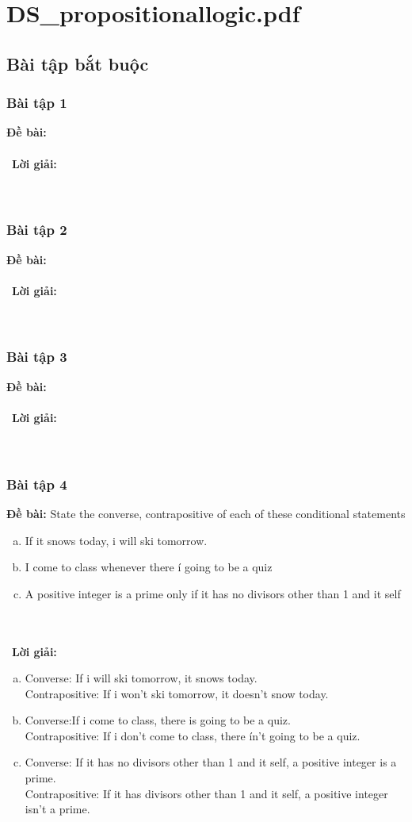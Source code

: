 \documentclass[a4paper]{article}
\begin{document}
\tableofcontents
\newpage
\section{DS\_propositionallogic.pdf}
\subsection{Bài tập bắt buộc}
\subsubsection{Bài tập 1}
\textbf{Đề bài:} 
\\\ \\\
\textbf{Lời giải:} \\\ \\\
\clearpage
\subsubsection{Bài tập 2}
\textbf{Đề bài:} 
\\\ \\\
\textbf{Lời giải:} \\\ \\\
\clearpage
\subsubsection{Bài tập 3}
\textbf{Đề bài:} 
\\\ \\\
\textbf{Lời giải:} \\\ \\\
\clearpage
\subsubsection{Bài tập 4} 
\textbf{Đề bài:} State the converse, contrapositive of each of these conditional statements
\begin{enumerate}[a)]
\item If it snows today, i will ski tomorrow.
\item I come to class whenever  there í going to be a quiz
\item A positive integer is a prime only if it has no divisors other than 1 and it self
\end{enumerate}
\\\ \\\
\textbf{Lời giải:} 
\begin{enumerate}[a)]
\item Converse: If i will ski tomorrow, it snows today.\\
Contrapositive: If i won't ski tomorrow, it doesn't snow today.
\item Converse:If i come to class, there is going to be a quiz.\\
Contrapositive: If i don't come to class, there ín't going to be a quiz.
\item Converse: If it has no divisors other than 1 and it self, a positive integer is a prime.\\
Contrapositive: If it has divisors other than 1 and it self, a positive integer isn't a prime.
\end{enumerate}
 \\\ \\\
\clearpage
\end{document}
